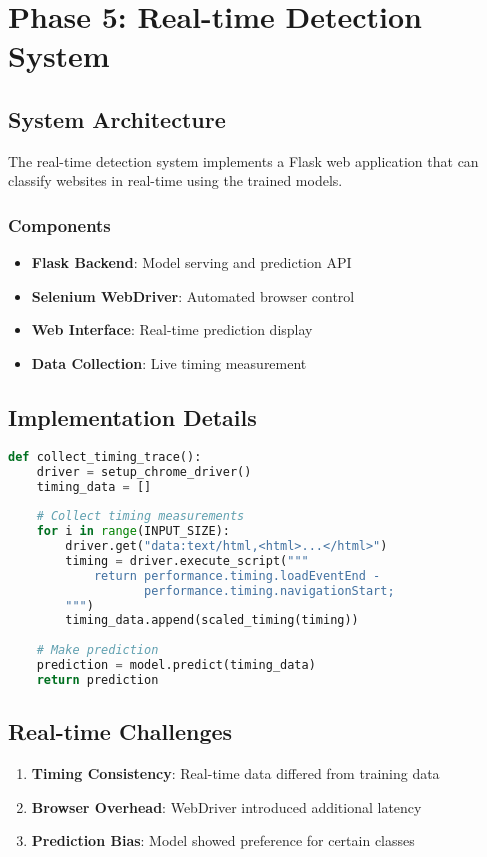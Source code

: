 \documentclass[11pt,a4paper]{article}
\begin{document}
\section{Phase 5: Real-time Detection System}

\subsection{System Architecture}
The real-time detection system implements a Flask web application that can classify websites in real-time using the trained models.

\subsubsection{Components}
\begin{itemize}
    \item \textbf{Flask Backend}: Model serving and prediction API
    \item \textbf{Selenium WebDriver}: Automated browser control
    \item \textbf{Web Interface}: Real-time prediction display
    \item \textbf{Data Collection}: Live timing measurement
\end{itemize}

\subsection{Implementation Details}
\begin{lstlisting}[language=Python,caption=Real-time Prediction Pipeline]
def collect_timing_trace():
    driver = setup_chrome_driver()
    timing_data = []
    
    # Collect timing measurements
    for i in range(INPUT_SIZE):
        driver.get("data:text/html,<html>...</html>")
        timing = driver.execute_script("""
            return performance.timing.loadEventEnd - 
                   performance.timing.navigationStart;
        """)
        timing_data.append(scaled_timing(timing))
    
    # Make prediction
    prediction = model.predict(timing_data)
    return prediction
\end{lstlisting}

\subsection{Real-time Challenges}
\begin{enumerate}
    \item \textbf{Timing Consistency}: Real-time data differed from training data
    \item \textbf{Browser Overhead}: WebDriver introduced additional latency
    \item \textbf{Prediction Bias}: Model showed preference for certain classes
\end{enumerate}
\end{document}
